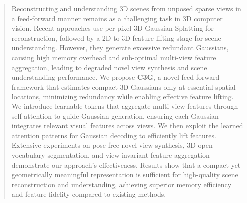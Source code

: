 \begin{abstract}
Reconstructing and understanding 3D scenes from unposed sparse views in a feed-forward manner remains as a challenging task in 3D computer vision. Recent approaches use per-pixel 3D Gaussian Splatting for reconstruction, followed by a 2D-to-3D feature lifting stage for scene understanding. However, they generate excessive redundant Gaussians, causing high memory overhead and sub-optimal multi-view feature aggregation, leading to degraded novel view synthesis and scene understanding performance. We propose \textbf{C3G}, a novel feed-forward framework that estimates compact 3D Gaussians only at essential spatial locations, minimizing redundancy while enabling effective feature lifting. We introduce learnable tokens that aggregate multi-view features through self-attention to guide Gaussian generation, ensuring each Gaussian integrates relevant visual features across views. We then exploit the learned attention patterns for Gaussian decoding to efficiently lift features. Extensive experiments on pose-free novel view synthesis, 3D open-vocabulary segmentation, and view-invariant feature aggregation demonstrate our approach's effectiveness. Results show that a compact yet geometrically meaningful representation is sufficient for high-quality scene reconstruction and understanding, achieving superior memory efficiency and feature fidelity compared to existing methods.
\end{abstract}
\vspace{-10pt}